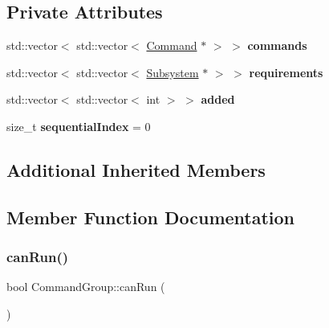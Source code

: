 \subsection*{Private Attributes}
\begin{DoxyCompactItemize}
\item 
\mbox{\label{classlib_iterative_robot_1_1_command_group_aa7a293ed14071e183070e00580ccbecf}} 
std\+::vector$<$ std\+::vector$<$ \mbox{\hyperlink{classlib_iterative_robot_1_1_command}{Command}} $\ast$ $>$ $>$ {\bfseries commands}
\item 
\mbox{\label{classlib_iterative_robot_1_1_command_group_ad804d6ab2feaec9e95dde18706548a89}} 
std\+::vector$<$ std\+::vector$<$ \mbox{\hyperlink{classlib_iterative_robot_1_1_subsystem}{Subsystem}} $\ast$ $>$ $>$ {\bfseries requirements}
\item 
\mbox{\label{classlib_iterative_robot_1_1_command_group_a93fe86db750ed4c728626eace7e66a2f}} 
std\+::vector$<$ std\+::vector$<$ int $>$ $>$ {\bfseries added}
\item 
\mbox{\label{classlib_iterative_robot_1_1_command_group_ae6ba0e30e4caa58f4b019ab496487ab7}} 
size\+\_\+t {\bfseries sequential\+Index} = 0
\end{DoxyCompactItemize}
\subsection*{Additional Inherited Members}


\subsection{Member Function Documentation}
\mbox{\label{classlib_iterative_robot_1_1_command_group_abd75c9b52e6b4ae5af1b6724e865311f}} 
\subsubsection{\texorpdfstring{canRun()}{canRun()}}
{\footnotesize\ttfamily bool Command\+Group\+::can\+Run (\begin{DoxyParamCaption}{ }\end{DoxyParamCaption})\hspace{0.3cm}{\ttfamily [virtual]}}



